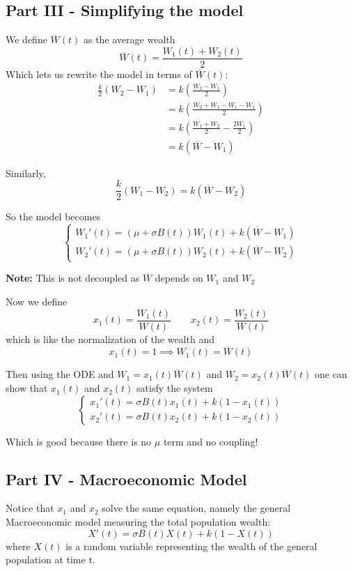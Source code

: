 \documentclass[12pt]{article}
\begin{document}
\subsection*{Part III - Simplifying the model}
We define $\overline W(t)$ as the average wealth 
\[\overline W(t) = \frac{W_1(t) + W_2(t)}{2}\]
Which lets us rewrite the model in terms of $\overline W(t)$: 
\begin{align*}
    \frac{k}{2}(W_2 - W_1) &= k\left(\frac{W_2 - W_1}{2}\right)\\
    &= k\left(\frac{W_2 + W_1 - W_1 - W_1}{2}\right)\\
    &= k\left(\frac{W_1 + W_2}{2} - \frac{2W_1}{2}\right)\\
    &= k(\overline W - W_1)
\end{align*}

Similarly,
\[\frac{k}{2}(W_1 - W_2) = k(\overline W - W_2)\]

So the model becomes 
\[\begin{cases}
    W_1'(t) = (\mu + \sigma B(t)) W_1(t) + k(\overline W - W_1)\\
    W_2'(t) = (\mu + \sigma B(t)) W_2(t) + k(\overline W - W_2)
\end{cases}\]

\textbf{Note:} This is not decoupled as $\overline W$ depends on $W_1$ and $W_2$ 

Now we define 
\[x_1(t) = \frac{W_1(t)}{W(t)} \qquad x_2(t) = \frac{W_2(t)}{W(t)}\]
which is like the normalization of the wealth and 
\[x_1(t) = 1 \implies W_1(t) = \overline W(t)\]

Then using the ODE and $W_1 = x_1(t) \overline W(t)$ and $W_2 = x_2(t) \overline W(t)$ one can show that $x_1(t)$ and $x_2(t)$ satisfy the system 
\[\begin{cases}
    x_1'(t) = \sigma B(t)x_1(t) + k(1 - x_1(t))\\
    x_2'(t) = \sigma B(t)x_2(t) + k(1 - x_2(t))
\end{cases}\]

Which is good because there is no $\mu$ term and no coupling!

\subsection*{Part IV - Macroeconomic Model}
Notice that $x_1$ and $x_2$ solve the same equation, namely the general Macroeconomic model measuring the total population wealth:
\[\boxed{X'(t) = \sigma B(t) X(t) + k(1 - X(t))}\]
where $X(t)$ is a random variable representing the wealth of the general population at time t. 
\end{document}
